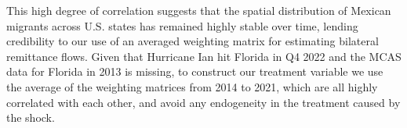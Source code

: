 This high degree of correlation suggests that the spatial distribution of Mexican migrants across U.S. states has remained highly stable over time, lending credibility to our use of an averaged weighting matrix for estimating bilateral remittance flows. Given that Hurricane Ian hit Florida in Q4 2022 and the MCAS data for Florida in 2013 is missing, to construct our treatment variable we use the average of the weighting matrices from 2014 to 2021, which are all highly correlated with each other, and avoid any endogeneity in the treatment caused by the shock.